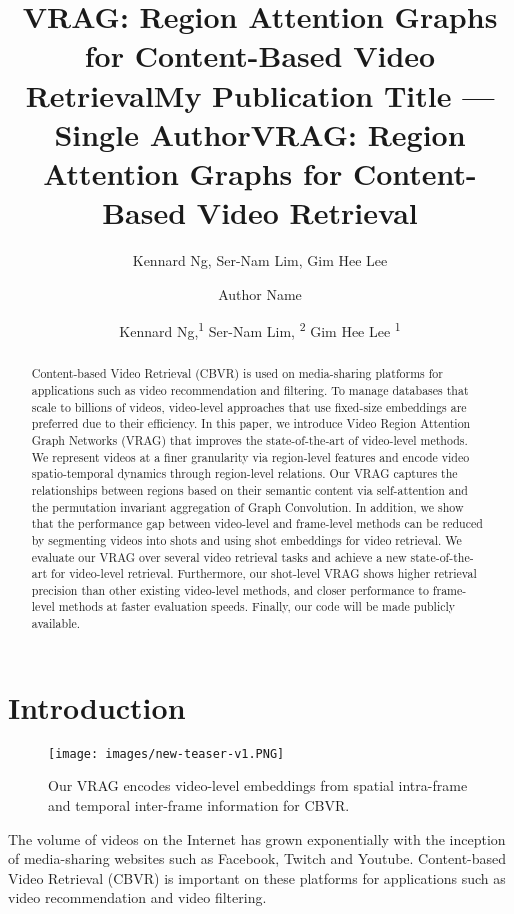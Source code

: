 \documentclass[letterpaper]{article} \usepackage{aaai22}  \usepackage{times}  \usepackage{helvet}  \usepackage{courier}  \usepackage[hyphens]{url}  \usepackage{graphicx} \urlstyle{rm} \usepackage{amsmath}
\title{VRAG: Region Attention Graphs for Content-Based Video Retrieval}
\author{Kennard Ng, Ser-Nam Lim, Gim Hee Lee}
\title{My Publication Title --- Single Author}
\author {
    Author Name
}
\title{VRAG: Region Attention Graphs for Content-Based Video Retrieval}
\author {
Kennard Ng,\textsuperscript{\rm 1}
    Ser-Nam Lim, \textsuperscript{\rm 2}
    Gim Hee Lee \textsuperscript{\rm 1}
}
\begin{document}
\maketitle

\begin{abstract}
Content-based Video Retrieval (CBVR) is used on media-sharing platforms for applications such as video recommendation and filtering. To manage databases that scale to billions of videos, video-level approaches that use fixed-size embeddings are preferred due to their efficiency.  In this paper, we introduce Video Region Attention Graph Networks (VRAG) that improves the state-of-the-art of video-level methods. We represent videos at a finer granularity via region-level features and encode video spatio-temporal dynamics through region-level relations. Our VRAG captures the relationships between regions based on their semantic content via self-attention and the permutation invariant aggregation of Graph Convolution. 
In addition, we show that the performance gap between 
video-level and frame-level methods can be reduced by segmenting videos into shots and using shot embeddings for video retrieval. We evaluate our VRAG over several video retrieval tasks and achieve a new state-of-the-art for video-level retrieval. Furthermore, our shot-level VRAG shows higher retrieval precision than other existing video-level methods, and closer performance to frame-level methods at faster evaluation speeds. Finally, our code will be made publicly available.
\end{abstract}

\section{Introduction}

\begin{figure}[t]
    \centering
    \texttt{[image: images/new-teaser-v1.PNG]}
    \caption{Our VRAG encodes video-level embeddings from spatial intra-frame and temporal inter-frame information for CBVR.} \vspace{-3mm}
    \label{fig:teaser}
\end{figure}

The volume of videos on the Internet has grown exponentially with the inception of media-sharing websites such as Facebook, Twitch and Youtube. 
Content-based Video Retrieval (CBVR) is important on these platforms for applications such as video recommendation and video filtering.
\end{document}
